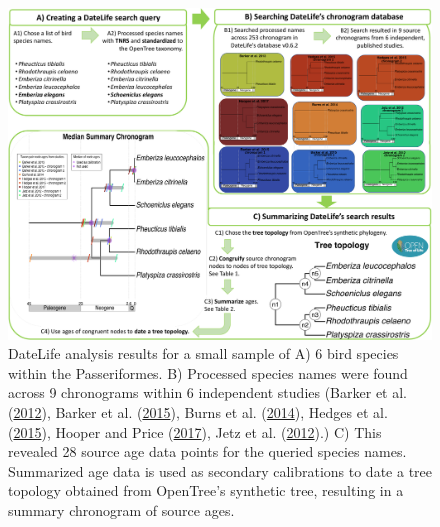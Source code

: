 \begin{figure}[!h]
\includegraphics[width=1\linewidth]{../figures/figure2/figure2.pdf}
\caption{DateLife analysis results for a small sample of A) 6 bird species within the Passeriformes. B) Processed species names were found across 9 chronograms within 6 independent studies (Barker et al. (\protect\hyperlink{ref-barker2012going}{2012}), Barker et al. (\protect\hyperlink{ref-barker2015new}{2015}), Burns et al. (\protect\hyperlink{ref-burns2014phylogenetics}{2014}), Hedges et al. (\protect\hyperlink{ref-Hedges2015}{2015}), Hooper and Price (\protect\hyperlink{ref-hooper2017chromosomal}{2017}), Jetz et al. (\protect\hyperlink{ref-Jetz2012}{2012}).) C) This revealed 28 source age data points for the queried species names. Summarized age data is used as secondary calibrations to date a tree topology obtained from OpenTree's synthetic tree, resulting in a summary chronogram of source ages.}
\label{fig:figure2}
\end{figure}


